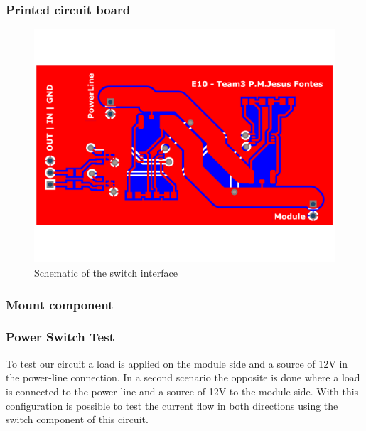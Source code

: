 \subsubsection{Printed circuit board}

\begin{figure}[H]
	\begin{centering}
		 \includegraphics[width=1.0\textwidth,page=1]{images/ps_layout.pdf}
		\caption{Schematic of the switch interface}
	\end{centering}
\end{figure}

\subsubsection{Mount component}

\begin{figure}[H]
	\begin{centering}
	\end{centering}
\end{figure}

\subsubsection{Power Switch Test}
To test our circuit a load is applied on the module side and a source of 12V in the power-line connection. In a second scenario the opposite is done where a load is connected to the power-line and a source of 12V to the module side.
With this configuration is possible to test the current flow in both directions using the switch component of this circuit.
